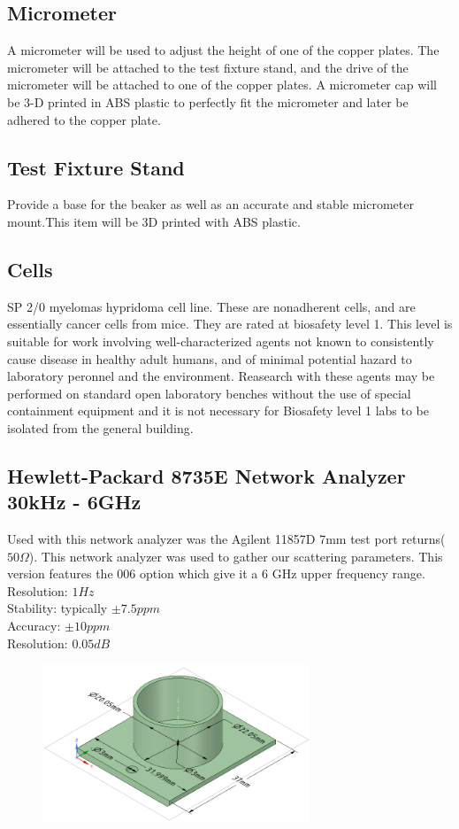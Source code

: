 \documentclass[journal]{IEEEtran}
\begin{document}
\subsection{Micrometer}
A micrometer will be used to adjust the height of one of the copper plates. The micrometer will be attached to the test fixture stand, and the drive of the micrometer will be attached to one of the copper plates. A micrometer cap will be 3-D printed in ABS plastic to perfectly fit the micrometer and later be adhered to the copper plate.

\subsection{Test Fixture Stand}
Provide a base for the beaker as well as an accurate and stable micrometer mount.This item will be 3D printed with ABS plastic.

\subsection{Cells}
SP 2/0 myelomas hypridoma cell line. These are nonadherent cells, and are essentially cancer cells from mice.\cite{mouse-myeloma-hybridoma-strain} They are rated at biosafety level 1. This level is suitable for work involving well-characterized agents not known to consistently cause disease in healthy adult humans, and of minimal potential hazard to laboratory peronnel and the environment. Reasearch with these agents may be performed on standard open laboratory benches without the use of special containment equipment and it is not necessary for Biosafety level 1 labs to be isolated from the general building.\cite{biosafety-levels}

\subsection{Hewlett-Packard 8735E Network Analyzer 30kHz - 6GHz}
Used with this network analyzer was the Agilent 11857D 7mm test port returns($50\Omega$). This network analyzer was used to gather our scattering parameters. This version features the 006 option which give it a 6 GHz upper frequency range.\\
Resolution: $1 Hz$ \\
Stability: typically $\pm7.5 ppm$ \\
Accuracy: $\pm10 ppm$\\
Resolution: $0.05 dB$

\begin{figure}[h]
\label{test-fixture}
\includegraphics[width=8cm]{Beaker.png}
\end{figure}
\end{document}
